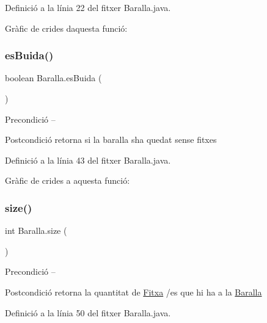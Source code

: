 Definició a la línia 22 del fitxer Baralla.\+java.

Gràfic de crides d\textquotesingle{}aquesta funció\+:
\mbox{\label{class_baralla_ac20fe10e5d263fb9630fd1111f4a9848}} 
\subsubsection{\texorpdfstring{es\+Buida()}{esBuida()}}
{\footnotesize\ttfamily boolean Baralla.\+es\+Buida (\begin{DoxyParamCaption}{ }\end{DoxyParamCaption})}

\begin{DoxyPrecond}{Precondició}
-- 
\end{DoxyPrecond}
\begin{DoxyPostcond}{Postcondició}
retorna si la baralla s\textquotesingle{}ha quedat sense fitxes 
\end{DoxyPostcond}


Definició a la línia 43 del fitxer Baralla.\+java.

Gràfic de crides a aquesta funció\+:
\mbox{\label{class_baralla_a9fa8e63f2507d81cee48f249fbb14d82}} 
\subsubsection{\texorpdfstring{size()}{size()}}
{\footnotesize\ttfamily int Baralla.\+size (\begin{DoxyParamCaption}{ }\end{DoxyParamCaption})}

\begin{DoxyPrecond}{Precondició}
-- 
\end{DoxyPrecond}
\begin{DoxyPostcond}{Postcondició}
retorna la quantitat de \mbox{\hyperlink{class_fitxa}{Fitxa}} /es que hi ha a la \mbox{\hyperlink{class_baralla}{Baralla}} 
\end{DoxyPostcond}


Definició a la línia 50 del fitxer Baralla.\+java.

\mbox{\label{class_baralla_a8822859a1184ed228be5cd955f7cbb05}} 
